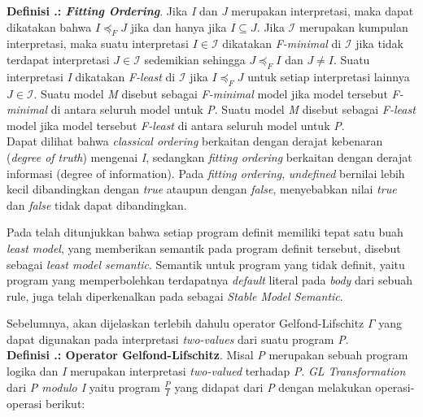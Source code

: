 \noindent \textbf{Definisi \thebabDuaNum.\thedefBabDua: \textit{Fitting Ordering}}. Jika \textit{I} dan \textit{J} merupakan interpretasi, maka dapat dikatakan bahwa $I \preceq_F J$ jika dan hanya jika $I \subseteq J$. Jika $\mathcal{I}$ merupakan kumpulan interpretasi, maka suatu interpretasi $I \in \mathcal{I}$ dikatakan \textit{F-minimal} di $\mathcal{I}$ jika tidak terdapat interpretasi $J \in \mathcal{I}$ sedemikian sehingga $J \preceq_F I$ dan $J \neq I$. Suatu interpretasi \textit{I} dikatakan \textit{F-least} di $\mathcal{I}$ jika $I \preceq_F J$ untuk setiap interpretasi lainnya $J \in \mathcal{I}$. Suatu model \textit{M} disebut sebagai \textit{F-minimal} model jika model tersebut \textit{F-minimal} di antara seluruh model untuk \textit{P}. Suatu model \textit{M} disebut sebagai \textit{F-least} model jika model tersebut \textit{F-least} di antara seluruh model untuk \textit{P}.
\\

Dapat dilihat bahwa \textit{classical ordering} berkaitan dengan derajat kebenaran (\textit{degree of truth}) mengenai \textit{I}, sedangkan \textit{fitting ordering} berkaitan dengan derajat informasi (degree of information). Pada \textit{fitting ordering}, \textit{undefined} bernilai lebih kecil dibandingkan dengan \textit{true} ataupun dengan \textit{false}, menyebabkan nilai \textit{true} dan \textit{false} tidak dapat dibandingkan.

Pada \citep{van1976semantics} telah ditunjukkan bahwa setiap program definit memiliki tepat satu buah \textit{least model}, yang memberikan semantik pada program definit tersebut, disebut sebagai \textit{least model semantic}. Semantik untuk program yang tidak definit, yaitu program yang memperbolehkan terdapatnya \textit{default} literal pada \textit{body} dari sebuah rule, juga telah diperkenalkan pada \citep{gelfond1988stable} sebagai \textit{Stable Model Semantic}. 

Sebelumnya, akan dijelaskan terlebih dahulu operator Gelfond-Lifschitz $\Gamma$ yang dapat digunakan pada interpretasi \textit{two-values} dari suatu program \textit{P}.
\\

\noindent \textbf{Definisi \thebabDuaNum.\thedefBabDua: Operator Gelfond-Lifschitz}. Misal \textit{P} merupakan sebuah program logika dan \textit{I} merupakan interpretasi \textit{two-valued} terhadap \textit{P}. \textit{GL Transformation} dari \textit{P modulo I} yaitu program $\frac{P}{I}$ yang didapat dari \textit{P} dengan melakukan operasi-operasi berikut:

